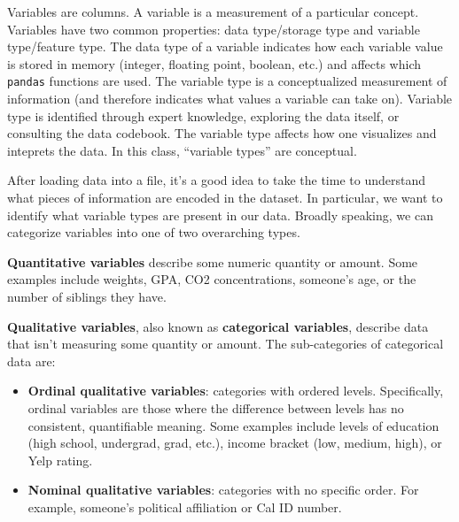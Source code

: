 \documentclass[
  letterpaper,
  DIV=11,
  numbers=noendperiod]{scrreprt}
\providecommand{\tightlist}{%
  \setlength{\itemsep}{0pt}\setlength{\parskip}{0pt}}\usepackage{longtable,booktabs,array}
\begin{document}
Variables are columns. A variable is a measurement of a particular
concept. Variables have two common properties: data type/storage type
and variable type/feature type. The data type of a variable indicates
how each variable value is stored in memory (integer, floating point,
boolean, etc.) and affects which \texttt{pandas} functions are used. The
variable type is a conceptualized measurement of information (and
therefore indicates what values a variable can take on). Variable type
is identified through expert knowledge, exploring the data itself, or
consulting the data codebook. The variable type affects how one
visualizes and inteprets the data. In this class, ``variable types'' are
conceptual.

After loading data into a file, it's a good idea to take the time to
understand what pieces of information are encoded in the dataset. In
particular, we want to identify what variable types are present in our
data. Broadly speaking, we can categorize variables into one of two
overarching types.

\textbf{Quantitative variables} describe some numeric quantity or
amount. Some examples include weights, GPA, CO2 concentrations,
someone's age, or the number of siblings they have.

\textbf{Qualitative variables}, also known as \textbf{categorical
variables}, describe data that isn't measuring some quantity or amount.
The sub-categories of categorical data are:

\begin{itemize}
\tightlist
\item
  \textbf{Ordinal qualitative variables}: categories with ordered
  levels. Specifically, ordinal variables are those where the difference
  between levels has no consistent, quantifiable meaning. Some examples
  include levels of education (high school, undergrad, grad, etc.),
  income bracket (low, medium, high), or Yelp rating.
\item
  \textbf{Nominal qualitative variables}: categories with no specific
  order. For example, someone's political affiliation or Cal ID number.
\end{itemize}
\end{document}
